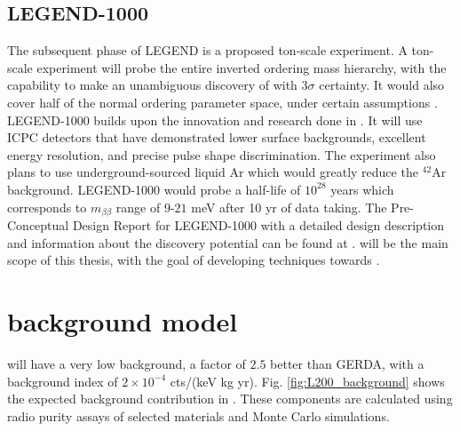 \subsection{LEGEND-1000}
The subsequent phase of LEGEND is a proposed ton-scale experiment. A ton-scale experiment will probe the entire inverted ordering mass hierarchy, with the capability to make an unambiguous discovery of {\onbb} with $3\sigma$ certainty. It would also cover half of the normal ordering parameter space, under certain assumptions \cite{l1000_pcdr}. LEGEND-1000 builds upon the innovation and research done in {\Ltwo}. It will use ICPC detectors that have demonstrated lower surface backgrounds, excellent energy resolution, and precise pulse shape discrimination. The experiment also plans to use underground-sourced liquid Ar which would greatly reduce the $^{42}$Ar background. LEGEND-1000 would probe a half-life of $10^{28}$ years which corresponds to $m_{\beta\beta}$ range of $9$-$21$ meV after 10 yr of data taking. The Pre-Conceptual Design Report for LEGEND-1000 with a detailed design description and information about the discovery potential can be found at \cite{l1000_pcdr}. {\Ltwo} will be the main scope of this thesis, with the goal of developing techniques towards {\Lthou}.




\section{{\Ltwo} background model}

{\Ltwo} will have a very low background, a factor of $2.5$ better than GERDA, with a background index of $2 \times 10^{-4}$ cts/(keV kg yr). Fig. \ref{fig:L200_background} shows the expected background contribution in {\Ltwo}. These components are calculated using radio purity assays of selected materials and Monte Carlo simulations. 



